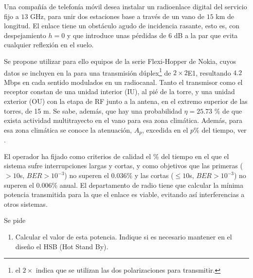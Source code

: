 Una compañía de telefonía móvil desea instalar un radioenlace digital del servicio fijo a $13$ GHz, para unir dos estaciones base a través de un vano de $15$ km de longitud. El enlace tiene un obstáculo agudo de incidencia rasante, esto es, con despejamiento $h=0$ y que introduce unas pérdidas de 6 dB a la par que evita cualquier reflexión en el suelo. 

Se propone utilizar para ello equipos de la serie Flexi-Hopper de Nokia, cuyos datos se incluyen en la  para una transmisión dúplex\footnote{ el $2\times$ indica que se utilizan las dos polarizaciones para transmitir.} de $2 \times 2$E1, resultando $4.2$ Mbps en cada sentido modulados en un radiocanal. Tanto el transmisor como el receptor constan de una unidad interior (IU), al pié de la torre, y una unidad exterior (OU) con la etapa de RF junto a la antena, en el extremo superior de las torres, de 15 m. Se sabe, además, que hay una probabilidad $\eta = 25.73$ \% de que exista actividad multitrayecto en el vano para esa zona climática. Además, para esa zona climática se conoce la atenuación, $A_p$, excedida en el $p$\% del tiempo, ver . 

El operador ha fijado como criterios de calidad el \% del tiempo en el que el sistema sufre interrupciones largas y cortas, y como objetivos que las primeras ($>10$s, $BER>10^{-3}$) no superen el $0.036\%$ y las cortas ($\leq10$s, $BER>10^{-3}$) no superen el 0.006\% anual. El departamento de radio tiene que calcular la mínima potencia transmitida para la que el enlace es viable, evitando así interferencias a otros sistemas. 
 
Se pide 
\begin{enumerate}%
\item Calcular el valor de esta potencia. Indique si es necesario mantener en el diseño el HSB (Hot Stand By).
\end{enumerate}   

